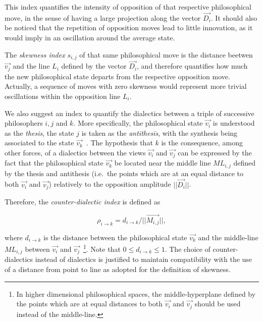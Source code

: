 \documentclass[%
 aip,
 jmp,%
 amsmath,amssymb,
 reprint,%
]{revtex4-1}
\begin{document}
This index quantifies the intensity of opposition of that respective
philosophical move, in the sense of having a large projection along
the vector $\vec{D_i}$.  It should also be noticed that the repetition
of opposition moves lead to little innovation, as it would imply in an
oscillation around the average state.

The \emph{skewness index} $s_{i,j}$ of that same philosophical move is
the distance beetwen $\vec{v_j}$ and the line $L_i$ defined by the
vector $\vec{D_i}$, and therefore quantifies how much the new
philosophical state departs from the respective opposition move.
Actually, a sequence of moves with zero skewness would represent more
trivial oscillations within the opposition line $L_i$.

We also suggest an index to quantify the dialectics between a triple
of successive philosophers $i, j$ and $k$.  More specifically, the
philosophical state $\vec{v_i}$ is understood as the \emph{thesis},
the state $j$ is taken as the \emph{antithesis}, with the synthesis
being associated to the state $\vec{v_k}$~\cite{Papineau}.  The
hypothesis that $k$ is the consequence, among other forces, of a
dialectics between the views $\vec{v_i}$ and $\vec{v_j}$ can be
expressed by the fact that the philosophical state $\vec{v_k}$ be
located near the middle line $ML_{i,j}$ defined by the thesis and
antithesis (i.e.\ the points which are at an equal distance to both
$\vec{v_i}$ and $\vec{v_j}$) relatively to the opposition amplitude
$|| \vec{D_i} ||$.

Therefore, the \emph{counter-dialectic index} is defined as 

\begin{equation}
\rho_{i \rightarrow k} = d_{i \rightarrow k}/ || \vec{M_{i,j}}||, 
\end{equation}

where $d_{i \rightarrow k}$ is the distance between the philosophical
state $\vec{v_k}$ and the middle-line $ML_{i,j}$ between $\vec{v_i}$
and $\vec{v_j}$~\footnote{In higher dimensional philosophical spaces,
the middle-hyperplane defined by the points which are at equal
distances to both $\vec{v_i}$ and $\vec{v_j}$ should be used instead
of the middle-line.}.  Note that $0 \leq d_{i \rightarrow k} \leq
1$.  The choice of counter-dialectics instead of dialectics is justified
to maintain compatibility with the use of a distance from point
to line as adopted for the definition of skewness.
\end{document}
